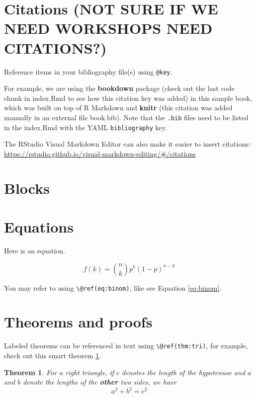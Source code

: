 \documentclass[
]{book}
\newtheorem{theorem}{Theorem}[chapter]
\theoremstyle{definition}
\theoremstyle{definition}
\theoremstyle{definition}
\theoremstyle{definition}
\theoremstyle{remark}
\begin{document}
\section{Citations (NOT SURE IF WE NEED WORKSHOPS NEED CITATIONS?)}\label{citations-not-sure-if-we-need-workshops-need-citations}

Reference items in your bibliography file(s) using \texttt{@key}.

For example, we are using the \textbf{bookdown} package \citep{R-bookdown} (check out the last code chunk in index.Rmd to see how this citation key was added) in this sample book, which was built on top of R Markdown and \textbf{knitr} \citep{xie2015} (this citation was added manually in an external file book.bib).
Note that the \texttt{.bib} files need to be listed in the index.Rmd with the YAML \texttt{bibliography} key.

The RStudio Visual Markdown Editor can also make it easier to insert citations: \url{https://rstudio.github.io/visual-markdown-editing/\#/citations}

\section{Blocks}\label{blocks}

\section{Equations}\label{equations}

Here is an equation.

\begin{equation} 
  f\left(k\right) = \binom{n}{k} p^k\left(1-p\right)^{n-k}
  \label{eq:binom}
\end{equation}

You may refer to using \texttt{\textbackslash{}@ref(eq:binom)}, like see Equation \eqref{eq:binom}.

\section{Theorems and proofs}\label{theorems-and-proofs}

Labeled theorems can be referenced in text using \texttt{\textbackslash{}@ref(thm:tri)}, for example, check out this smart theorem \ref{thm:tri}.

\begin{theorem}
\protect\hypertarget{thm:tri}{}\label{thm:tri}For a right triangle, if \(c\) denotes the \emph{length} of the hypotenuse
and \(a\) and \(b\) denote the lengths of the \textbf{other} two sides, we have
\[a^2 + b^2 = c^2\]
\end{theorem}
\end{document}
